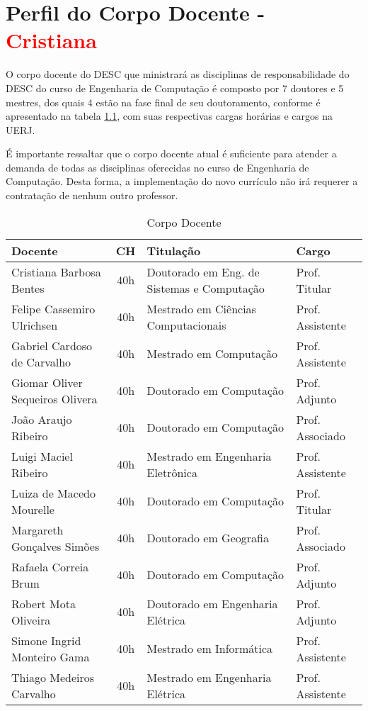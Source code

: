 \chapter{Perfil do Corpo Docente - \textcolor{red}{Cristiana}}

O corpo docente do DESC que ministrará as disciplinas de responsabilidade do DESC do curso de Engenharia de Computação é composto por 7 doutores e 5 mestres, dos quais 4 estão na fase final de seu doutoramento, conforme é apresentado na tabela \ref{CorpoDocente}, com suas respectivas cargas horárias e cargos na UERJ.

É importante ressaltar que o corpo docente atual é suficiente para atender a demanda de todas as disciplinas oferecidas no curso de Engenharia de Computação. Desta forma, a implementação do novo currículo não irá requerer a contratação de nenhum outro professor.

\begin{table}
	\centering
	\caption{Corpo Docente}
	\label{CorpoDocente}
	\begin{tabular}{|l|c|l|l|}
		\hline
		{\textbf{Docente}}                   & \textbf{CH} & \textbf{Titulação}                         & \textbf{Cargo}  \\
		\hline
		Cristiana Barbosa Bentes             & 40h         & Doutorado em Eng. de Sistemas e Computação & Prof. Titular \\
		Felipe Cassemiro Ulrichsen	         & 40h         & Mestrado em Ciências Computacionais      	& Prof. Assistente\\
		Gabriel Cardoso de Carvalho          & 40h         & Mestrado em Computação                     & Prof. Assistente\\
		Giomar Oliver Sequeiros Olivera      & 40h         & Doutorado em Computação                    & Prof. Adjunto   \\
		João Araujo Ribeiro                  & 40h         & Doutorado em Computação                    & Prof. Associado \\
		Luigi Maciel Ribeiro 	             & 40h         & Mestrado em Engenharia Eletrônica          & Prof. Assistente \\
		Luiza de Macedo Mourelle             & 40h         & Doutorado em Computação                    & Prof. Titular \\
		Margareth Gonçalves Simões           & 40h         & Doutorado em Geografia                     & Prof. Associado \\
		Rafaela Correia Brum		         & 40h         & Doutorado em Computação                    & Prof. Adjunto   \\	
		Robert Mota Oliveira		         & 40h         & Doutorado em Engenharia Elétrica           & Prof. Adjunto   \\	
		Simone Ingrid Monteiro Gama		     & 40h         & Mestrado em Informática             		& Prof. Assistente\\	
		Thiago Medeiros Carvalho		     & 40h         & Mestrado em Engenharia Elétrica            & Prof. Assistente\\	
		\hline
	\end{tabular}
\end{table}


